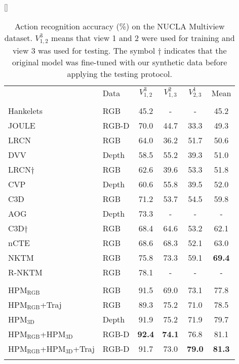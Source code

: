 \documentclass[twocolumn]{svjour3}          \smartqed  \usepackage{graphicx}
\begin{document}
\begin{table*}
[\FBwidth]
{\caption{Action recognition accuracy (\%) on the NUCLA Multiview dataset. $V_{1,2}^3$ means that view 1 and 2 were used for training and view 3 was used for testing. The symbol $\dagger$ indicates that the original model was fine-tuned with our synthetic data before applying the testing protocol.}
\label{tab:nucla_comp}}
{
\begin{tabular}{llcccc}
\hline\noalign{\smallskip}
\multicolumn{ 1}{l}{Method} & \multicolumn{ 1}{l}{Data} & $V_{1,2}^3$ & $V_{1,3}^2$ & $V_{2,3}^1$ & \multicolumn{ 1}{c}{Mean} \\ 
\noalign{\smallskip}\hline\noalign{\smallskip}
\multicolumn{ 6}{c}{\textbf{Baseline}} \\
\noalign{\smallskip}\hline\noalign{\smallskip}

Hankelets~\citep{Hankelets} & RGB & 45.2 & - & - & 45.2 \\ JOULE~\citep{hu2015jointly} & RGB-D & 70.0 & 44.7 & 33.3 & 49.3 \\ LRCN~\citep{LRCN} & RGB & 64.0 & 36.2 & 51.7 & 50.6 \\
DVV~\citep{DVV} & Depth & 58.5 & 55.2 & 39.3 & 51.0 \\ LRCN$\dagger$ & RGB & 62.6 & 39.6 & 53.3 & 51.8 \\
CVP~\citep{CVP} & Depth & 60.6 & 55.8 & 39.5 & 52.0 \\ C3D~\citep{tran2015learning} & RGB & 71.2 & 53.7 & 54.5 & 59.8 \\ 
AOG~\citep{AOG} & Depth & 73.3 & - & - & - \\ C3D$\dagger$ & RGB & 68.4 & 64.6 & 53.2 & 62.1 \\
nCTE~\citep{nCTE} & RGB & 68.6 & 68.3 & 52.1 & 63.0 \\ NKTM~\citep{NKTM} & RGB & 75.8 & 73.3 & 59.1 & \textbf{69.4} \\ R-NKTM~\citep{rahmani2017learning} & RGB & 78.1 & - & - & - \\ 

\noalign{\smallskip}\hline\noalign{\smallskip}
\multicolumn{ 6}{c}{\textbf{Proposed}} \\ \noalign{\smallskip}\hline\noalign{\smallskip}

HPM$_{\mathrm{RGB}}$ & RGB & 91.5 & 69.0 & 73.1 & 77.8 \\ HPM$_{\mathrm{RGB}}$+Traj & RGB & 89.3 & 75.2 & 71.0 & 78.5 \\ HPM$_{\mathrm{3D}}$ & Depth & 91.9 & 75.2 & 71.9 & 79.7 \\ HPM$_{\mathrm{RGB}}$+HPM$_{\mathrm{3D}}$ & RGB-D & \textbf{92.4} & \textbf{74.1} & 76.8 & 81.1 \\ HPM$_{\mathrm{RGB}}$+HPM$_{\mathrm{3D}}$+Traj & RGB-D & 91.7 & 73.0 & \textbf{79.0} & \textbf{81.3} \\ \hline\noalign{\smallskip}
\end{tabular}
}
\end{table*}
\end{document}
